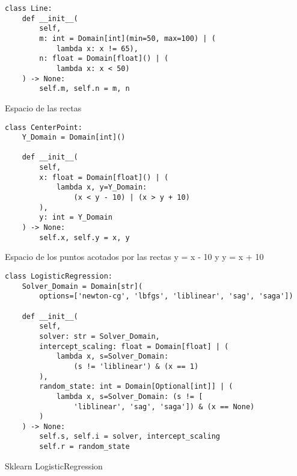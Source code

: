 \tableofcontents
\listoffigures
\listoftables
\listofalgorithms

\lstlistoflistings

\begin{listing}[!ht]
    \begin{verbatim}
class Line:
    def __init__(
        self,
        m: int = Domain[int](min=50, max=100) | (
            lambda x: x != 65),
        n: float = Domain[float]() | (
            lambda x: x < 50)
    ) -> None:
        self.m, self.n = m, n
    \end{verbatim}
    \caption{Espacio de las rectas}
    \label{lst:rectas}
\end{listing}


\begin{listing}[!ht]
    \begin{verbatim}
class CenterPoint:
    Y_Domain = Domain[int]()
    
    def __init__(
        self,
        x: float = Domain[float]() | (
            lambda x, y=Y_Domain: 
                (x < y - 10) | (x > y + 10)
        ),
        y: int = Y_Domain
    ) -> None:
        self.x, self.y = x, y
    \end{verbatim}
    \caption{Espacio de los puntos acotados por las rectas y = x - 10 y y = x + 10}
    \label{lst:points}
\end{listing}

\begin{listing}[!ht]
    \begin{verbatim}
class LogisticRegression:
    Solver_Domain = Domain[str](
        options=['newton-cg', 'lbfgs', 'liblinear', 'sag', 'saga'])

    def __init__(
        self,
        solver: str = Solver_Domain,
        intercept_scaling: float = Domain[float] | (
            lambda x, s=Solver_Domain: 
                (s != 'liblinear') & (x == 1)
        ),
        random_state: int = Domain[Optional[int]] | (
            lambda x, s=Solver_Domain: (s != [
                'liblinear', 'sag', 'saga']) & (x == None)
        )
    ) -> None:
        self.s, self.i = solver, intercept_scaling
        self.r = random_state
    \end{verbatim}
    \caption{Sklearn LogisticRegression}
    \label{lst:sklearn}
\end{listing}

